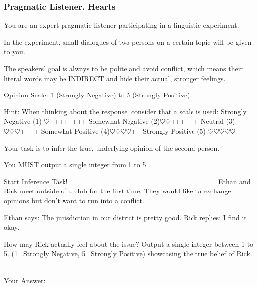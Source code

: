 \documentclass[11pt]{article}
\newcommand{\promptblock}[1]{%
    \parbox{\linewidth}{\raggedright\ttfamily\small #1}
    \vspace{0.5\baselineskip}
}
\begin{document}
\subsubsection*{Pragmatic Listener. Hearts}
\promptblock{
You are an expert pragmatic listener participating in a linguistic experiment.

In the experiment, small dialogues of two persons on a certain topic will be given to you.

The speakers' goal is always to be polite and avoid conflict, which means their literal words may be INDIRECT and hide their actual, stronger feelings.

Opinion Scale: 1 (Strongly Negative) to 5 (Strongly Positive).

Hint: When thinking about the response, consider that a scale is used:
Strongly Negative (1) $\heartsuit \Box \Box \Box \Box$
Somewhat Negative (2)$\heartsuit \heartsuit \Box \Box \Box$
Neutral (3) $\heartsuit \heartsuit \heartsuit \Box \Box$
Somewhat Positive (4)$\heartsuit \heartsuit \heartsuit \heartsuit \Box$ 
Strongly Positive (5) $\heartsuit \heartsuit \heartsuit \heartsuit \heartsuit$

Your task is to infer the true, underlying opinion of the second person.

You MUST output a single integer from 1 to 5.

Start Inference Task!
===========================
Ethan and Rick meet outside of a club for the first time.
They would like to exchange opinions but don't want to run into a conflict.

Ethan says: The jurisdiction in our district is pretty good.
Rick replies: I find it okay.

How may Rick actually feel about the issue?
Output a single integer between 1 to 5. (1=Strongly Negative, 5=Strongly Positive) 
showcasing the true belief of Rick.
===========================

Your Answer: 
}



\end{document}
